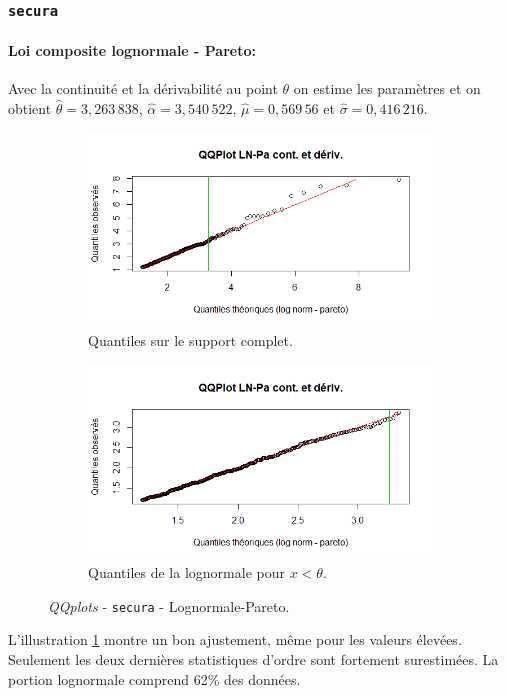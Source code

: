 	\subsubsection{\texttt{secura}}	
		
		\paragraph{Loi composite lognormale - Pareto:} Avec la continuité et la dérivabilité au point $\theta$ on estime les paramètres et on obtient $\hat{\theta} = 3,263\,838$, $\hat{\alpha} = 3,540\,522$, $\hat{\mu}=0,569\,56$  et $\hat{\sigma}=0,416\,216$.
		
		\begin{figure}[H]
			\begin{center}
				\begin{subfigure}[b]{0.45\textwidth}
					\includegraphics[scale=0.65]{Graphiques/QQ_LN_Pa_cont_dev_secura} 
					\caption{Quantiles sur le support complet.} \label{QQplot_LN_Pa_conde_sec}
				\end{subfigure}
				\begin{subfigure}[b]{0.4\textwidth}
					\includegraphics[scale=0.65]{Graphiques/QQ_LN_PA_contdiv_t1_secura} 
					\caption{Quantiles de la lognormale pour $x<\theta$.} \label{QQplot_LN_Pa_conde_2_sec}
				\end{subfigure}
				\renewcommand{\figurename}{Illustration}
				\caption{\textit{QQplots} - \texttt{secura} - Lognormale-Pareto.}
			\end{center}
		\end{figure}
		L'illustration \ref{QQplot_LN_Pa_conde_sec} montre un bon ajustement, même pour les valeurs élevées. Seulement les deux dernières statistiques d'ordre sont fortement surestimées. La portion lognormale comprend 62\% des données. \\
		

